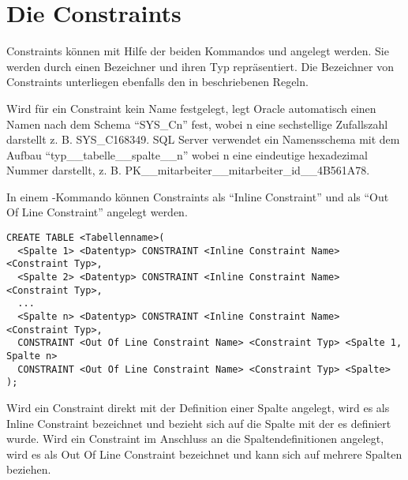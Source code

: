     \section{Die Constraints}
      Constraints können mit Hilfe der beiden Kommandos  und  angelegt werden. Sie werden durch
      einen Bezeichner und ihren Typ repräsentiert. Die Bezeichner von
      Constraints unterliegen ebenfalls den in 
      beschriebenen Regeln.
      \begin{merke}
        Wird für ein Constraint kein Name festgelegt, legt Oracle automatisch
        einen Namen nach dem Schema \enquote{SYS\_Cn} fest, wobei n eine
        sechstellige Zufallszahl darstellt  z. B. SYS\_C168349. SQL Server
        verwendet ein Namensschema mit dem Aufbau
        \enquote{typ\_\_tabelle\_\_spalte\_\_n} wobei n eine eindeutige
        hexadezimal Nummer darstellt, z. B.
        PK\_\_mitarbeiter\_\_mitarbeiter\_id\_\_4B561A78.
      \end{merke}
      In einem -Kommando können Constraints als \enquote{Inline Constraint} und als \enquote{Out Of Line Constraint} angelegt werden.
      \begin{lstlisting}[language=oracle_sql,caption={Constraints erstellen},label=sql09_01]
CREATE TABLE <Tabellenname>(
  <Spalte 1> <Datentyp> CONSTRAINT <Inline Constraint Name> <Constraint Typ>,
  <Spalte 2> <Datentyp> CONSTRAINT <Inline Constraint Name> <Constraint Typ>,
  ...
  <Spalte n> <Datentyp> CONSTRAINT <Inline Constraint Name> <Constraint Typ>,
  CONSTRAINT <Out Of Line Constraint Name> <Constraint Typ> <Spalte 1, Spalte n>
  CONSTRAINT <Out Of Line Constraint Name> <Constraint Typ> <Spalte>
);
      \end{lstlisting}
      \begin{merke}
        Wird ein Constraint direkt mit der Definition einer Spalte angelegt, wird es als Inline Constraint bezeichnet und bezieht sich auf die Spalte mit der es definiert wurde. Wird ein Constraint im Anschluss an die Spaltendefinitionen angelegt, wird es als Out Of Line Constraint bezeichnet und kann sich auf mehrere Spalten beziehen.
      \end{merke}
